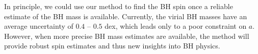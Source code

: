 \documentclass{aa}
\begin{document}
In principle, we could use our method to find the BH spin once a reliable estimate of the BH mass is available. Currently, the virial BH masses have an average uncertainty of $0.4$ -- $0.5$ dex, which leads only to a poor constraint on $a$. However, when more precise BH mass estimates are available, the method will provide robust spin estimates and thus new insights into BH physics.

















\medskip
\let\itshape\upshape
\end{document}
